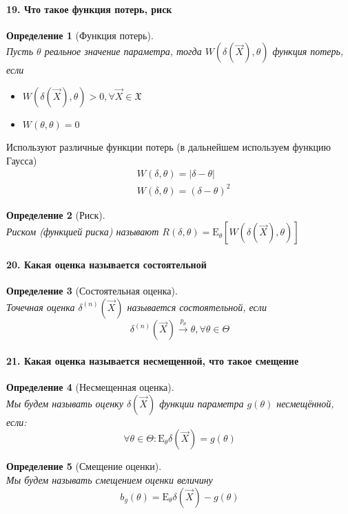 \documentclass[titlepage]{article}
\newcommand{\sX}{\mathfrak{X}}
\newcommand{\sE}{\mathrm{E}}
\newtheorem{definition}{Определение}
\begin{document}
\paragraph{19. Что такое функция потерь, риск}
\begin{definition}[Функция потерь] ~\\
	Пусть $\theta$ реальное значение параметра, тогда $W(\delta (\vec{X}),\theta)$ функция потерь, если
	\begin{itemize}
	 	\item $W(\delta (\vec{X}),\theta)>0,\forall \vec{X} \in \sX$
	 	\item $W(\theta,\theta)=0$
	 \end{itemize} 
\end{definition}
Используют различные функции потерь (в дальнейшем используем функцию Гаусса)
\begin{align}
	& W(\delta,\theta)=|\delta-\theta| \tag{Лаплас} \\
	& W(\delta,\theta)=(\delta-\theta)^2 \tag{Гаусс}
\end{align}
\begin{definition}[Риск]~\\
	Риском (функцией риска) называют $R(\delta,\theta) = \sE_\theta[W(\delta(\vec{X}),\theta)]$
\end{definition}

\paragraph{20. Какая оценка называется состоятельной}
\begin{definition}[Состоятельная оценка] ~\\
	 Точечная оценка $\delta^{(n)}(\vec{X})$ называется состоятельной, если
	 $$\delta^{(n)}(\vec{X}) \xrightarrow{p_\theta} \theta,\forall \theta \in \Theta $$
\end{definition}

\paragraph{21. Какая оценка называется несмещенной, что такое смещение}
\begin{definition}[Несмещенная оценка] ~\\
	Мы будем называть оценку $\delta(\vec X)$ функции параметра $g(\theta)$ несмещённой, если:
	\[\forall \theta \in \Theta: \sE_\theta\delta(\vec X) = g(\theta)\]
\end{definition}
\begin{definition}[Смещение оценки] ~\\
	Мы будем называть смещением оценки величину
	\[b_g(\theta) = \sE_\theta\delta(\vec X) - g(\theta)\]
\end{definition}
\end{document}
